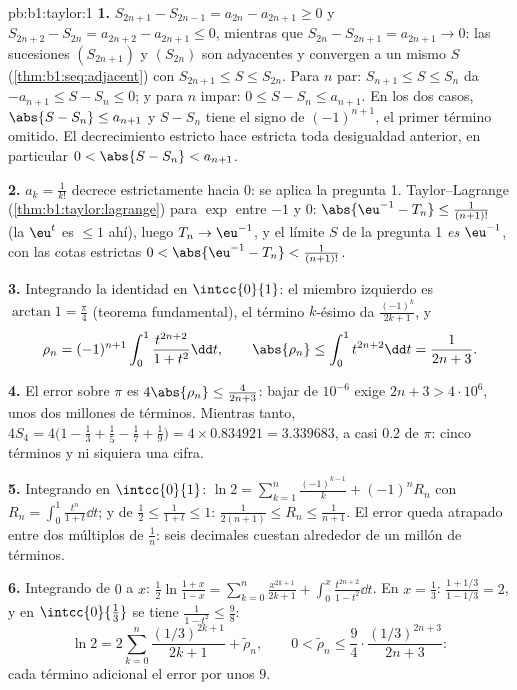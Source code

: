 \begin{solution}{pb:b1:taylor:1}
\textbf{1.} $S_{2n+1} - S_{2n-1} = a_{2n} - a_{2n+1} \geq 0$ y
$S_{2n+2} - S_{2n} = a_{2n+2} - a_{2n+1} \leq 0$, mientras que
$S_{2n} - S_{2n+1} = a_{2n+1} \to 0$: las sucesiones $(S_{2n+1})$ y
$(S_{2n})$ son adyacentes y convergen a un mismo $S$
(\cref{thm:b1:seq:adjacent}) con $S_{2n+1} \leq S \leq S_{2n}$. Para
$n$ par: $S_{n+1} \leq S \leq S_n$ da
$-a_{n+1} \leq S - S_n \leq 0$; y para $n$ impar:
$0 \leq S - S_n \leq a_{n+1}$. En los dos casos,
$\abs{S - S_n} \leq a_{n+1}$ y $S - S_n$ tiene el signo de
$(-1)^{n+1}$, el primer término omitido. El decrecimiento estricto
hace estricta toda desigualdad anterior, en particular
$0 < \abs{S - S_n} < a_{n+1}$.

\textbf{2.} $a_k = \frac{1}{k!}$ decrece estrictamente hacia $0$:
se aplica la pregunta 1. Taylor--Lagrange
(\cref{thm:b1:taylor:lagrange}) para $\exp$ entre $-1$ y $0$:
$\abs{\eu^{-1} - T_n} \leq \frac{1}{(n+1)!}$ (la  $\eu^t$ es
$\leq 1$ ahí), luego $T_n \to \eu^{-1}$, y el límite $S$ de la
pregunta 1 \emph{es} $\eu^{-1}$, con las cotas estrictas
$0 < \abs{\eu^{-1} - T_n} < \frac{1}{(n+1)!}$.

\textbf{3.} Integrando la identidad en $\intcc{0}{1}$: el miembro
izquierdo es $\arctan 1 = \frac\pi4$ (teorema fundamental), el
término $k$-ésimo da $\frac{(-1)^k}{2k+1}$, y
\[
\rho_n = (-1)^{n+1}\int_0^1 \frac{t^{2n+2}}{1+t^2}\dd t,
\qquad
\abs{\rho_n} \leq \int_0^1 t^{2n+2}\dd t = \frac{1}{2n+3} .
\]

\textbf{4.} El error sobre $\pi$ es
$4\abs{\rho_n} \leq \frac{4}{2n+3}$: bajar de $10^{-6}$ exige
$2n + 3 > 4\cdot10^6$, unos dos millones de términos. Mientras
tanto, $4S_4 = 4\bigl(1 - \frac13 + \frac15 - \frac17 +
\frac19\bigr) = 4 \times 0.834921 = 3.339683$, a casi $0.2$ de
$\pi$: cinco términos y ni siquiera una cifra.

\textbf{5.} Integrando en $\intcc{0}{1}$:
$\ln 2 = \sum_{k=1}^{n} \frac{(-1)^{k-1}}{k} + (-1)^n R_n$ con
$R_n = \int_0^1 \frac{t^n}{1+t}\dd t$; y de
$\frac12 \leq \frac{1}{1+t} \leq 1$:
$\frac{1}{2(n+1)} \leq R_n \leq \frac{1}{n+1}$. El error queda
atrapado entre dos múltiplos de $\frac1n$: seis decimales cuestan
alrededor de un millón de términos.

\textbf{6.} Integrando de $0$ a $x$:
$\frac12\ln\frac{1 + x}{1 - x} = \sum_{k=0}^{n}
\frac{x^{2k+1}}{2k+1} + \int_0^x \frac{t^{2n+2}}{1-t^2}\dd t$. En
$x = \frac13$: $\frac{1 + 1/3}{1 - 1/3} = 2$, y en
$\intcc{0}{\frac13}$ se tiene $\frac{1}{1 - t^2} \leq \frac98$:
\[
\ln 2 = 2\sum_{k=0}^{n} \frac{(1/3)^{2k+1}}{2k+1} +
\tilde\rho_n,
\qquad
0 < \tilde\rho_n \leq \frac{9}{4}\cdot
\frac{(1/3)^{2n+3}}{2n+3} :
\]
cada término adicional  el error por unos $9$.


\end{solution}
